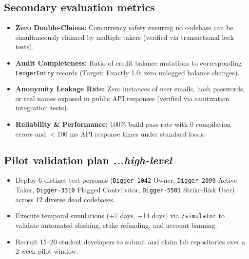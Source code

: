 \documentclass[11pt,a4paper]{article}
\begin{document}
\subsection{Secondary evaluation metrics}
\begin{itemize}
    \item \textbf{Zero Double-Claims:} Concurrency safety ensuring no codebase can be simultaneously claimed by multiple takers (verified via transactional lock tests).
    \item \textbf{Audit Completeness:} Ratio of credit balance mutations to corresponding \texttt{LedgerEntry} records (Target: Exactly 1.0; zero unlogged balance changes).
    \item \textbf{Anonymity Leakage Rate:} Zero instances of user emails, hash passwords, or real names exposed in public API responses (verified via sanitization integration tests).
    \item \textbf{Reliability \& Performance:} 100\% build pass rate with 0 compilation errors and $<100$ ms API response times under standard loads.
\end{itemize}

\subsection{Pilot validation plan \hfill \normalfont\small\textit{...high-level}}
\begin{itemize}
    \item Deploy 6 distinct test personas (\texttt{Digger-1042} Owner, \texttt{Digger-2099} Active Taker, \texttt{Digger-3310} Flagged Contributor, \texttt{Digger-5501} Strike-Risk User) across 12 diverse dead codebases.
    \item Execute temporal simulations (+7 days, +14 days) via \texttt{/simulator} to validate automated slashing, stake refunding, and account banning.
    \item Recruit 15--20 student developers to submit and claim lab repositories over a 2-week pilot window.
\end{itemize}
\end{document}
